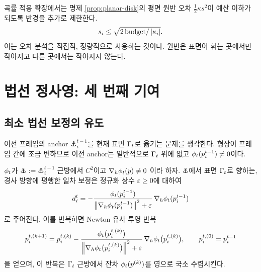 곡률 적응 확장에서는 명제 \ref{prop:planar-disk}의 평면 원반 오차
$\tfrac12\kappa s^2$이 예산 이하가 되도록 반경을 추가로 제한한다.
\begin{equation}
  s_i \le \sqrt{2\,\mathrm{budget}/\left\lvert \kappa_i \right\rvert}.
  \label{eq:curvature-scale}
\end{equation}
이는 오차 분석을 직접적, 정량적으로 사용하는 것이다. 원반은 표면이 휘는 곳에서만
작아지고 다른 곳에서는 작아지지 않는다.

\section{법선 정사영: 세 번째 기여}
\label{sec:projection}

\subsection{최소 법선 보정의 유도}

이전 프레임의 anchor $\anchor^{t-1}_i$를 현재 표면 $\Gamma_t$로 옮기는 문제를
생각한다. 형상이 프레임 간에 조금 변하므로 이전 anchor는 일반적으로 $\Gamma_t$ 위에
없고 $\phi_t(p^{t-1}_i)\ne0$이다.

\begin{theorem}[최소 법선 보정과 반복 투영]
\label{thm:projection}
$\phi_t$가 $\anchor := \anchor^{t-1}_i$ 근방에서 $C^2$이고 $\nabla_h\phi_t(p)\ne0$
이라 하자. $\anchor$에서 표면 $\Gamma_t$로 향하는, 경사 방향에 평행한 일차 보정은
정규화 상수 $\varepsilon\ge0$에 대하여
\begin{equation}
  d^t_i = -\frac{\phi_t(p^{t-1}_i)}
                {\left\lVert \nabla_h\phi_t(p^{t-1}_i) \right\rVert^2 + \varepsilon}
          \,\nabla_h\phi_t(p^{t-1}_i)
  \label{eq:minimal-step}
\end{equation}
로 주어진다. 이를 반복하면 Newton 유사 투영 반복
\begin{equation}
  p^{t,(k+1)}_i = p^{t,(k)}_i
  - \frac{\phi_t\bigl(p^{t,(k)}_i\bigr)}
         {\left\lVert \nabla_h\phi_t\bigl(p^{t,(k)}_i\bigr) \right\rVert^2+\varepsilon}
    \,\nabla_h\phi_t\bigl(p^{t,(k)}_i\bigr),
  \qquad p^{t,(0)}_i = p^{t-1}_i
  \label{eq:projection-iter}
\end{equation}
을 얻으며, 이 반복은 $\Gamma_t$ 근방에서 잔차 $\phi_t(p^{(k)})$를 영으로 국소
수렴시킨다.
\end{theorem}

